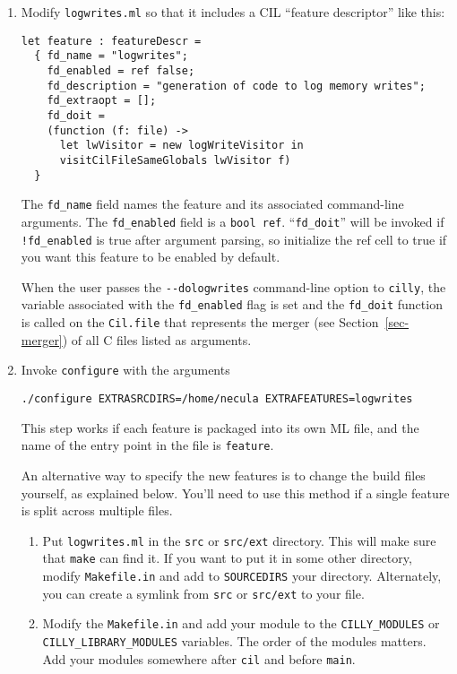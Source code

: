 \documentclass{article}
\def\secref#1{Section~\ref{sec-#1}}
\def\t#1{{\tt #1}}
\begin{document}
 \begin{enumerate}

 \item Modify \t{logwrites.ml} so that it includes a CIL ``feature
 descriptor'' like this: 
\begin{verbatim}
let feature : featureDescr = 
  { fd_name = "logwrites";              
    fd_enabled = ref false;
    fd_description = "generation of code to log memory writes";
    fd_extraopt = [];
    fd_doit = 
    (function (f: file) -> 
      let lwVisitor = new logWriteVisitor in
      visitCilFileSameGlobals lwVisitor f)
  } 
\end{verbatim}
  The \t{fd\_name} field names the feature and its associated
  command-line arguments. The \t{fd\_enabled} field is a \t{bool ref}.
  ``\t{fd\_doit}'' will be invoked if \t{!fd\_enabled} is true after
  argument parsing, so initialize the ref cell to true if you want
  this feature to be enabled by default.
  
  When the user passes the \t{-{}-{}dologwrites}
  command-line option to \t{cilly}, the variable associated with the
  \t{fd\_enabled} flag is set and the \t{fd\_doit} function is called
  on the \t{Cil.file} that represents the merger (see \secref{merger}) of
  all C files listed as arguments. 

 \item Invoke \t{configure} with the arguments
\begin{verbatim}
./configure EXTRASRCDIRS=/home/necula EXTRAFEATURES=logwrites
\end{verbatim}

 This step works if each feature is packaged into its own ML file, and the
name of the entry point in the file is \t{feature}.

 An alternative way to specify the new features is to change the build files
yourself, as explained below.  You'll need to use this method if a single
feature is split across multiple files.

\begin{enumerate}
 \item Put \t{logwrites.ml} in the \t{src} or \t{src/ext} directory. This
 will make sure that \t{make} can find it. If you want to put it in some
 other directory, modify \t{Makefile.in} and add to \t{SOURCEDIRS} your
 directory.  Alternately, you can create a symlink from \t{src} or
 \t{src/ext} to your file.

 \item Modify the \t{Makefile.in} and add your module to the 
 \t{CILLY\_MODULES} or
 \t{CILLY\_LIBRARY\_MODULES} variables. The order of the modules matters. Add
 your modules somewhere after \t{cil} and before \t{main}.


\end{enumerate}
\end{enumerate}
\end{document}
